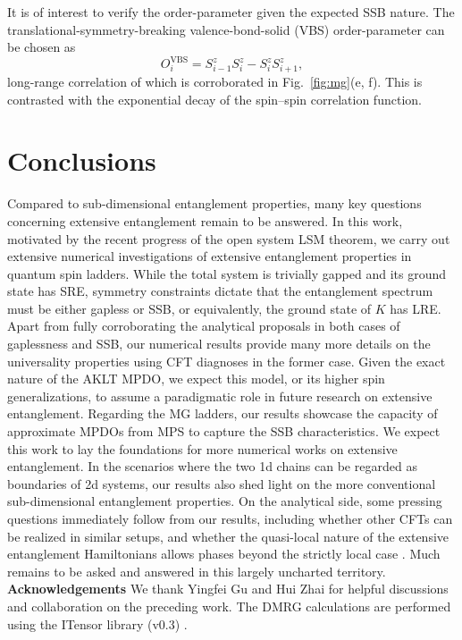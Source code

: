 \documentclass[twocolumn,aps,prb,english]{revtex4-2}
\begin{document}
It is of interest to verify the order-parameter given the expected SSB nature. The translational-symmetry-breaking valence-bond-solid (VBS) order-parameter can be chosen as
\begin{equation}
O_i^\mathrm{VBS}=S_{i-1}^z S_{i}^z-S_i^z S_{i+1}^z,
\end{equation}
long-range correlation of which is corroborated in Fig.~\ref{fig:mg}(e, f). This is contrasted with the exponential decay of the spin--spin correlation function.

\section{Conclusions}
Compared to sub-dimensional entanglement properties, many key questions concerning extensive entanglement remain to be answered. In this work, motivated by the recent progress of the open system LSM theorem, we carry out extensive numerical investigations of extensive entanglement properties in quantum spin ladders. While the total system is trivially gapped and its ground state has SRE, symmetry constraints dictate that the entanglement spectrum must be either gapless or SSB, or equivalently, the ground state of $K$ has LRE. Apart from fully corroborating the analytical proposals in both cases of gaplessness and SSB, our numerical results provide many more details on the universality properties using CFT diagnoses in the former case. Given the exact nature of the AKLT MPDO, we expect this model, or its higher spin generalizations, to assume a paradigmatic role in future research on extensive entanglement. Regarding the MG ladders, our results showcase the capacity of approximate MPDOs from MPS to capture the SSB characteristics. We expect this work to lay the foundations for more numerical works on extensive entanglement. In the scenarios where the two 1d chains can be regarded as boundaries of 2d systems, our results also shed light on the more conventional sub-dimensional entanglement properties.  On the analytical side, some pressing questions immediately follow from our results, including whether other CFTs can be realized in similar setups, and whether the quasi-local nature of the extensive entanglement Hamiltonians allows phases beyond the strictly local case \cite{Li2023}. Much remains to be asked and answered in this largely uncharted territory.\\

\noindent
{\bf Acknowledgements}
We thank Yingfei Gu and Hui Zhai for helpful discussions and collaboration on the preceding work. The DMRG calculations are performed using the ITensor library (v0.3) \cite{ITensor}.\\
\end{document}
